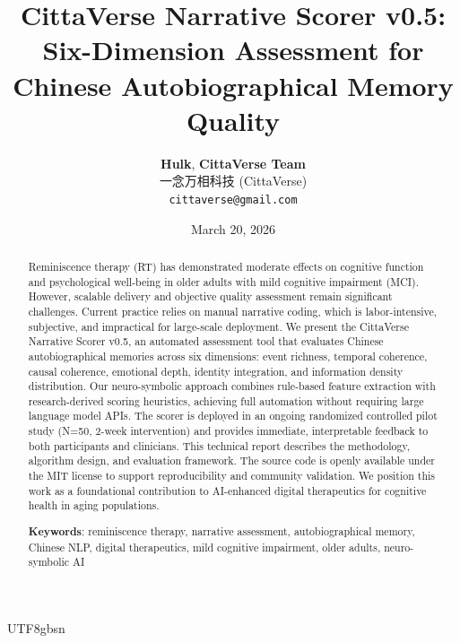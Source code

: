 \documentclass{article}
\begin{document}
\begin{CJK}{UTF8}{gbsn}

\title{\textbf{CittaVerse Narrative Scorer v0.5: Six-Dimension Assessment for Chinese Autobiographical Memory Quality}}

\author{
    \textbf{Hulk}, \textbf{CittaVerse Team} \\
    一念万相科技 (CittaVerse) \\
    \texttt{cittaverse@gmail.com} \\
}

\date{March 20, 2026}

\maketitle

\end{CJK}

\begin{abstract}
\noindent Reminiscence therapy (RT) has demonstrated moderate effects on cognitive function and psychological well-being in older adults with mild cognitive impairment (MCI). However, scalable delivery and objective quality assessment remain significant challenges. Current practice relies on manual narrative coding, which is labor-intensive, subjective, and impractical for large-scale deployment. We present the CittaVerse Narrative Scorer v0.5, an automated assessment tool that evaluates Chinese autobiographical memories across six dimensions: event richness, temporal coherence, causal coherence, emotional depth, identity integration, and information density distribution. Our neuro-symbolic approach combines rule-based feature extraction with research-derived scoring heuristics, achieving full automation without requiring large language model APIs. The scorer is deployed in an ongoing randomized controlled pilot study (N=50, 2-week intervention) and provides immediate, interpretable feedback to both participants and clinicians. This technical report describes the methodology, algorithm design, and evaluation framework. The source code is openly available under the MIT license to support reproducibility and community validation. We position this work as a foundational contribution to AI-enhanced digital therapeutics for cognitive health in aging populations.

\vspace{0.5em}
\noindent\textbf{Keywords}: reminiscence therapy, narrative assessment, autobiographical memory, Chinese NLP, digital therapeutics, mild cognitive impairment, older adults, neuro-symbolic AI
\end{abstract}
\end{document}
